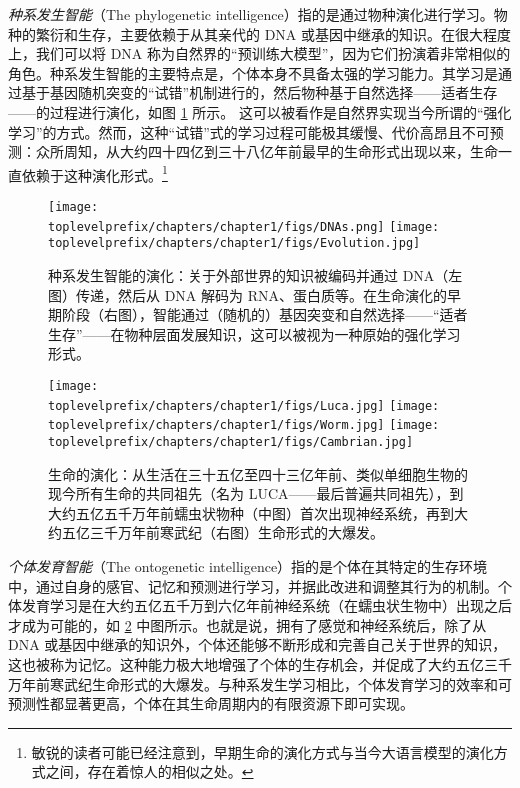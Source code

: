 \documentclass[../../book-main_zh.tex]{subfiles}
\begin{document}
{\em 种系发生智能}（The phylogenetic intelligence）指的是通过物种演化进行学习。物种的繁衍和生存，主要依赖于从其亲代的 DNA 或基因中继承的知识。在很大程度上，我们可以将 DNA 称为自然界的“预训练大模型”，因为它们扮演着非常相似的角色。种系发生智能的主要特点是，个体本身不具备太强的学习能力。其学习是通过基于基因随机突变的“试错”机制进行的，然后物种基于自然选择——适者生存——的过程进行演化，如图 \ref{fig:phylogenetic} 所示。
这可以被看作是自然界实现当今所谓的“强化学习”的方式。然而，这种“试错”式的学习过程可能极其缓慢、代价高昂且不可预测：众所周知，从大约四十四亿到三十八亿年前最早的生命形式出现以来，生命一直依赖于这种演化形式。\footnote{敏锐的读者可能已经注意到，早期生命的演化方式与当今大语言模型的演化方式之间，存在着惊人的相似之处。} 
\begin{figure}
    \centering
\texttt{[image: \\toplevelprefix/chapters/chapter1/figs/DNAs.png]}
\texttt{[image: \\toplevelprefix/chapters/chapter1/figs/Evolution.jpg]}
    \caption{种系发生智能的演化：关于外部世界的知识被编码并通过 DNA（左图）传递，然后从 DNA 解码为 RNA、蛋白质等。在生命演化的早期阶段（右图），智能通过（随机的）基因突变和自然选择——“适者生存”——在物种层面发展知识，这可以被视为一种原始的强化学习形式。}
    \label{fig:phylogenetic}
\end{figure}
\begin{figure}
    \centering
\texttt{[image: \\toplevelprefix/chapters/chapter1/figs/Luca.jpg]}
\texttt{[image: \\toplevelprefix/chapters/chapter1/figs/Worm.jpg]}
\texttt{[image: \\toplevelprefix/chapters/chapter1/figs/Cambrian.jpg]}
    \caption{生命的演化：从生活在三十五亿至四十三亿年前、类似单细胞生物的现今所有生命的共同祖先（名为 LUCA——最后普遍共同祖先），到大约五亿五千万年前蠕虫状物种（中图）首次出现神经系统，再到大约五亿三千万年前寒武纪（右图）生命形式的大爆发。}
    \label{fig:evolution}
\end{figure}

{\em 个体发育智能}（The ontogenetic intelligence）指的是个体在其特定的生存环境中，通过自身的感官、记忆和预测进行学习，并据此改进和调整其行为的机制。个体发育学习是在大约五亿五千万到六亿年前神经系统（在蠕虫状生物中）出现之后才成为可能的，如 \ref{fig:evolution} 中图所示。也就是说，拥有了感觉和神经系统后，除了从 DNA 或基因中继承的知识外，个体还能够不断形成和完善自己关于世界的知识，这也被称为记忆。这种能力极大地增强了个体的生存机会，并促成了大约五亿三千万年前寒武纪生命形式的大爆发。与种系发生学习相比，个体发育学习的效率和可预测性都显著更高，个体在其生命周期内的有限资源下即可实现。
\end{document}
